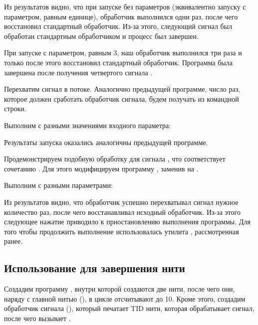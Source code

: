Из результатов видно, что при запуске без параметров (эквивалентно запуску с параметром, равным единице), обработчик выполнился одни раз, после чего восстановил стандартный обработчик. Из-за этого, следующий сигнал  был обработан стандартным обработчиком и процесс был завершен.

При запуске с параметром, равным 3, наш обработчик выполнился три раза и только после этого восстановил стандартный обработчик. Программа была завершена после получения четвертого сигнала .

Перехватим сигнал  в потоке. Аналогично предыдущей программе, число раз, которое должен сработать обработчик сигнала, будем получать из командной строки.



Выполним  с разными значениями входного параметра:



Результаты запуска оказались аналогичны предыдущей программе.

Продемонстрируем подобную обработку для сигнала , что соответствует сочетанию . Для этого модифицируем программу , заменив  на .



Выполним с разными параметрами:



Из результатов видно, что обработчик успешно перехватывал сигнал  нужное количество раз, после чего восстанавливал исходный обработчик. Из-за этого следующее нажатие  приводило к приостановлению выполнения программы. Для того чтобы продолжить выполнение использовалась утилита , рассмотренная ранее.

\newpage

\subsection{Использование  для завершения нити}

Создадим программу , внутри которой создаются две нити, после чего они, наряду с главной нитью (), в цикле отсчитывают до 10. Кроме этого, создадим обработчик сигнала (), который печатает TID нити, которая обрабатывает сигнал, после чего вызывает .

